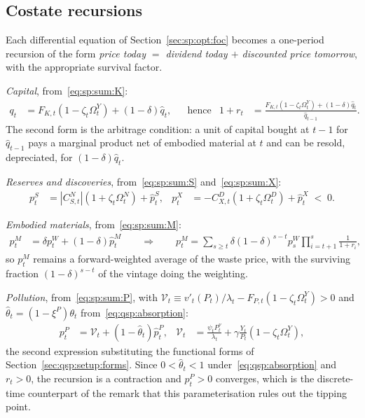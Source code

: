 \subsection{Costate recursions}\label{sec:qsp:model:costates}

Each differential equation of Section~\ref{sec:sp:opt:foc} becomes a one-period recursion of the form
\emph{price today $=$ dividend today $+$ discounted price tomorrow}, with the appropriate survival
factor.

\emph{Capital}, from~\eqref{eq:sp:sum:K}:
\begin{align}
q_t &= F_{K,t}\left(1-\zeta_t\Omega^Y_t\right)+\left(1-\delta\right)\hat q_t,
&&\text{hence}&
1+r_t &= \frac{F_{K,t}\left(1-\zeta_t\Omega^Y_t\right)+\left(1-\delta\right)\hat q_t}{\hat q_{t-1}} .
\label{eq:qsp:costate:K}
\end{align}
The second form is the arbitrage condition: a unit of capital bought at $t-1$ for $\hat q_{t-1}$ pays a
marginal product net of embodied material at $t$ and can be resold, depreciated, for $\left(1-\delta\right)\hat q_t$.

\emph{Reserves and discoveries}, from~\eqref{eq:sp:sum:S} and~\eqref{eq:sp:sum:X}:
\begin{align}
p^S_t &= \left|C^N_{S,t}\right|\left(1+\zeta_t\Omega^N_t\right)+\hat p^S_t,
&
p^X_t &= -C^D_{X,t}\left(1+\zeta_t\Omega^D_t\right)+\hat p^X_t\;<\;0 .
\label{eq:qsp:costate:SX}
\end{align}

\emph{Embodied materials}, from~\eqref{eq:sp:sum:M}:
\begin{align}
p^M_t &= \delta p^W_t+\left(1-\delta\right)\hat p^M_t
\qquad\Longrightarrow\qquad
p^M_t = \sum_{s\ge t}\delta\left(1-\delta\right)^{s-t}p^W_s\prod_{i=t+1}^{s}\frac{1}{1+r_i},
\label{eq:qsp:costate:M}
\end{align}
so $p^M_t$ remains a forward-weighted average of the waste price, with the surviving fraction
$\left(1-\delta\right)^{s-t}$ of the vintage doing the weighting.

\emph{Pollution}, from~\eqref{eq:sp:sum:P}, with
$\mathcal V_t\equiv v'_t\!\left(P_t\right)/\lambda_t-F_{P,t}\left(1-\zeta_t\Omega^Y_t\right)>0$ and
$\hat\theta_t=\left(1-\xi^P\right)\theta_t$ from~\eqref{eq:qsp:absorption}:
\begin{align}
p^P_t &= \mathcal V_t+\left(1-\hat\theta_t\right)\hat p^P_t,
&
\mathcal V_t &= \frac{\psi_tP_t^{\nu}}{\lambda_t}+\gamma\frac{Y_t}{P_t}\left(1-\zeta_t\Omega^Y_t\right),
\label{eq:qsp:costate:P}
\end{align}
the second expression substituting the functional forms of Section~\ref{sec:qsp:setup:forms}. Since
$0<\hat\theta_t<1$ under~\eqref{eq:qsp:absorption} and $r_t>0$, the recursion is a contraction and
$p^P_t>0$ converges, which is the discrete-time counterpart of the remark that this parameterisation
rules out the tipping point.

